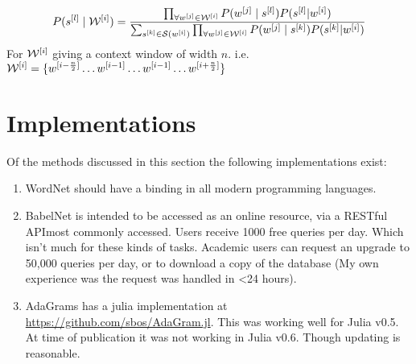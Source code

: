 \documentclass[12pt,parskip]{komatufte}
\begin{document}
\begin{equation}
P(\n s_l \mid \n \seq{W}_i) = 
\frac{\prod_{\forall \n w_{j}\in \n \seq{W}_i} P(\n w_{j} \mid \n s_l) P(\n s_l | \n w_i)}{\sum_{\n s_k \in \seq S(\n w_i)} \prod_{\forall \n w_{j} \in \n \seq{W}_i} P(\n w_{j} \mid \n s_k) P(\n s_k | \n w_i)}
\end{equation}
For $\n \seq{W}_i$ giving a context window of width $n$. i.e. $\n \seq{W}_i = \lbrace \n w_{i-\frac{n}{2}} \ldots \n w_{i-1} \ldots \n w_{i-1} \ldots \n w_{i+\frac{n}{2}} \rbrace$


\section{Implementations}
Of the methods discussed in this section the following implementations exist:
\begin{enumerate}
	\item WordNet \parencite{tengi1998design} should have a binding in all modern programming languages.
	\item BabelNet \parencite{navigli2010babelnet} is intended to be accessed as an online resource, via a RESTful APImost commonly accessed. Users receive 1000 free queries per day. Which isn't much for these kinds of tasks. Academic users can request an upgrade to 50,000 queries per day, or to download a copy of the database (My own experience was the request was handled in <24 hours).
	\item AdaGrams \parencite{AdaGrams} has a julia implementation at \url{https://github.com/sbos/AdaGram.jl}. This was working well for Julia v0.5. At time of publication it was not working in Julia v0.6. Though updating is reasonable.
\end{enumerate}
\end{document}
